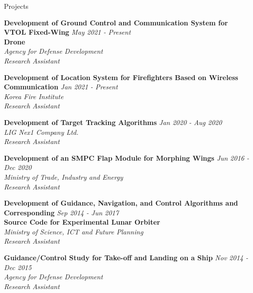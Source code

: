 \documentclass{resume}
\begin{document}
\begin{rSection}{Projects}

{\textbf{Development of Ground Control and Communication System for VTOL Fixed-Wing} \hfill {\em May 2021 - Present} \\ \textbf{Drone}} 
\\{\textit{ Agency for Defense Development}}
\\{\textit{ Research Assistant}}

{\bf Development of Location System for Firefighters Based on Wireless Communication} \hfill {\em Jan 2021 - Present} 
\\{\textit{ Korea Fire Institute}}
\\{\textit{ Research Assistant}}

{\bf Development of Target Tracking Algorithms} \hfill {\em Jan 2020 - Aug 2020} 
\\{\textit{ LIG Nex1 Company Ltd.}}
\\{\textit{ Research Assistant}}

{\bf Development of an SMPC Flap Module for Morphing Wings} \hfill {\em Jun 2016 - Dec 2020} 
\\{\textit{ Ministry of Trade, Industry and Energy}}
\\{\textit{ Research Assistant}}

{\textbf{Development of Guidance, Navigation, and Control Algorithms and Corresponding} \hfill {\em Sep 2014 - Jun 2017} \\ \textbf{Source Code for Experimental Lunar Orbiter}}  
\\{\textit{ Ministry of Science, ICT and Future Planning}}
\\{\textit{ Research Assistant}}

{\bf Guidance/Control Study for Take-off and Landing on a Ship} \hfill {\em Nov 2014 - Dec 2015} 
\\{\textit{ Agency for Defense Development}}
\\{\textit{ Research Assistant}}



\end{rSection}
\end{document}
